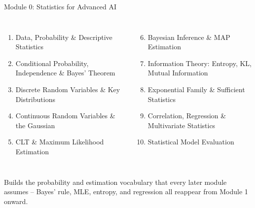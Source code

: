 \begin{frame}{Module 0: Statistics for Advanced AI}
\footnotesize
\begin{columns}[T]
\begin{enumerate}
  \item Data, Probability \& Descriptive Statistics
  \item Conditional Probability, Independence \& Bayes' Theorem
  \item Discrete Random Variables \& Key Distributions
  \item Continuous Random Variables \& the Gaussian
  \item CLT \& Maximum Likelihood Estimation
\end{enumerate}
\begin{enumerate}
  \setcounter{enumi}{5}
  \item Bayesian Inference \& MAP Estimation
  \item Information Theory: Entropy, KL, Mutual Information
  \item Exponential Family \& Sufficient Statistics
  \item Correlation, Regression \& Multivariate Statistics
  \item Statistical Model Evaluation
\end{enumerate}
\end{columns}
\pause
\begin{rlintuition}
Builds the probability and estimation vocabulary that every later module assumes -- Bayes' rule, MLE, entropy, and regression all reappear from Module 1 onward.
\end{rlintuition}
\end{frame}

